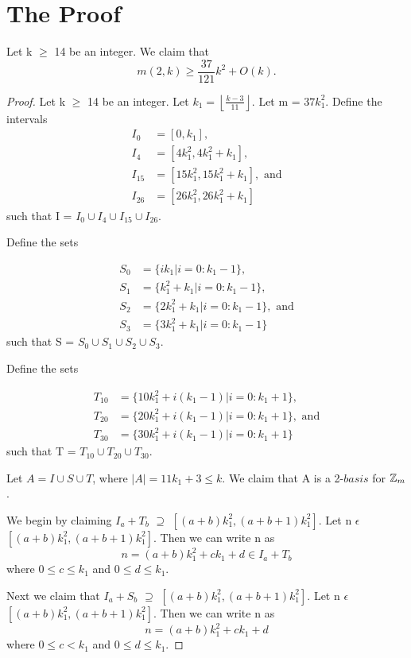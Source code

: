 \section{ The Proof}
\begin{theorem}
Let k $\geq$ 14 be an integer. We claim that
 \[
m(2,k) \geq \frac{37}{121}k^2 + O(k). 
\]
\end{theorem}
\begin{proof}
Let k $\geq$ 14 be an integer. Let $k_1 = \left \lfloor \frac{k - 3}{11} \right \rfloor$. Let m = $37k_1^2$.  Define the intervals
\begin{align*}
I_0 &= [0, k_1], \\
I_4 &= [4k_1^2, 4k_1^2+k_1], \\
I_{15} &= [15k_1^2, 15k_1^2+k_1], \text{ and} \\
I_{26} &= [26k_1^2, 26k_1^2+k_1] 
\end{align*}
such that I = $I_0 \cup I_4 \cup I_{15} \cup I_{26}.$

Define the sets

\begin{align*}
S_0 &= \{ik_1 | i = 0 : k_1 - 1\},\\
S_1 &= \{k_1^2 + k_1 | i = 0 : k_1 - 1\},\\
S_2 &= \{2k_1^2 + k_1 | i = 0 : k_1 - 1\}, \text{ and}\\
S_3 &= \{3k_1^2 + k_1 | i = 0 : k_1 - 1\}
\end{align*}
such that S = $S_0 \cup S_1 \cup S_2 \cup S_3.$

Define the sets

\begin{align*}
T_{10} &= \{10k_1^2+ i(k_1 - 1) | i = 0 : k_1 + 1\},\\
T_{20} &= \{20k_1^2 + i(k_1 - 1) | i = 0 : k_1 + 1\}, \text{ and}\\
T_{30} &= \{30k_1^2 + i(k_1 - 1) | i = 0 : k_1 + 1\}
\end{align*}
such that T = $T_{10} \cup T_{20} \cup T_{30} .$

Let $A = I \cup S \cup T$, where $|A| = 11k_1 + 3 \leq k$. We claim that A is a 2-$basis$ for $\mbox{$\mathbb Z$}_m$.

We begin by claiming $I_a + T_b$ $\supseteq$ $[(a + b)k_1^2 ,  (a + b + 1)k_1^2]$. Let n $\epsilon$ $[(a + b)k_1^2 ,  (a + b + 1)k_1^2]$.
Then we can write n as 
\[
n = (a + b) k_1^2 + ck_1 + d \in I_a + T_b
\]
where $0 \leq c \leq k_1$ and $0 \leq d \leq k_1$. 

Next we claim that  $I_a + S_b$ $\supseteq$ $[(a + b)k_1^2 ,  (a + b + 1)k_1^2]$. Let n $\epsilon$ $[(a + b)k_1^2 ,  (a + b + 1)k_1^2]$.
Then we can write n as 
\[
n = (a + b) k_1^2 + ck_1 + d 
\]
where  $0 \leq c < k_1$ and $0 \leq d \leq k_1$. 


\end{proof}
